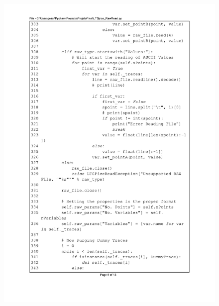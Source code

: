 \begin{figure}[]
\centering
\includegraphics[scale=0.9]{01_Pre_textuais/code/leitura9.pdf}
\end{figure}
